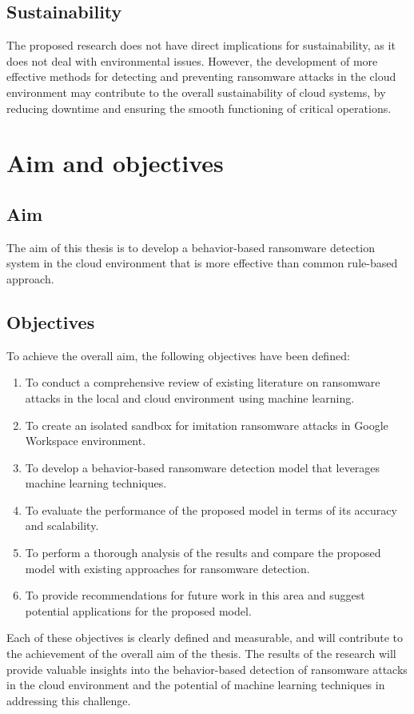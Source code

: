 \documentclass[12pt,a4paper,twoside]{article}
\begin{document}
\subsection{Sustainability}\label{sec:Sustainability}

The proposed research does not have direct implications for sustainability, as it does not deal with environmental issues. However, the development of more effective methods for detecting and preventing ransomware attacks in the cloud environment may contribute to the overall sustainability of cloud systems, by reducing downtime and ensuring the smooth functioning of critical operations.

\section{Aim and objectives}
\label{sec:aim}
\subsection{Aim}\label{sec:Aim}
The aim of this thesis is to develop a behavior-based ransomware detection system in the cloud environment that is more effective than common rule-based approach.
\subsection{Objectives}\label{sec:Objectives}

To achieve the overall aim, the following objectives have been defined:

\begin{enumerate}
\item To conduct a comprehensive review of existing literature on ransomware attacks in the local and cloud environment using machine learning.

\item To create an isolated sandbox for imitation ransomware attacks in Google Workspace environment.

\item To develop a behavior-based ransomware detection model that leverages machine learning techniques.
 
\item To evaluate the performance of the proposed model in terms of its accuracy and scalability.

\item To perform a thorough analysis of the results and compare the proposed model with existing approaches for ransomware detection.

\item To provide recommendations for future work in this area and suggest potential applications for the proposed model.

\end{enumerate}
Each of these objectives is clearly defined and measurable, and will contribute to the achievement of the overall aim of the thesis. The results of the research will provide valuable insights into the behavior-based detection of ransomware attacks in the cloud environment and the potential of machine learning techniques in addressing this challenge.
\end{document}

